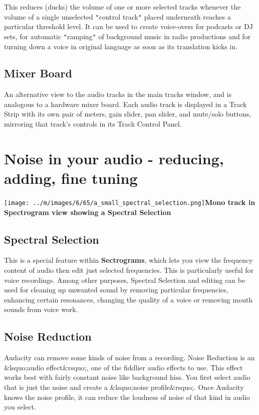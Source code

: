 \documentclass[twocolumn]{book}
\begin{document}
This reduces (ducks) the volume of one or more selected tracks whenever the volume of a single unselected \texttt{{}"{}}control track\texttt{{}"{}} placed underneath reaches a particular threshold level. It can be used to create voice-overs for podcasts or DJ sets, for automatic \texttt{{}"{}}ramping\texttt{{}"{}} of background music in radio productions and for turning down a voice in original language as soon as its translation kicks in.

\subsection{Mixer Board}


An alternative view to the audio tracks in the main tracks window, and is analogous to a hardware mixer board. Each audio track is displayed in a Track Strip with its own pair of meters, gain slider, pan slider, and mute/solo buttons, mirroring that track's controls in its Track Control Panel. 



\section{Noise in your audio - reducing, adding, fine tuning}

\par\texttt{[image: ../m/images/6/65/a\_small\_spectral\_selection.png]}\textbf{Mono track in Spectrogram view showing a Spectral Selection}

\subsection{Spectral Selection}


This is a special feature within \textbf{Sectrograms}, which lets you view the frequency content of audio then edit just selected frequencies.  This is particularly useful for voice recordings.  Among other purposes, Spectral Selection and editing can be used for cleaning up unwanted sound by removing particular frequencies, enhancing certain resonances, changing the quality of a voice or removing mouth sounds from voice work.

\subsection{Noise Reduction}


Audacity can remove some kinds of noise from a recording.  Noise Reduction is an \&lsquo;audio effect\&rsquo;, one of the fiddlier audio effects to use.  This effect works best with fairly constant noise like background hiss.  You first select audio that is just the noise and create a \&lsquo;noise profile\&rsquo;.  Once Audacity knows the noise profile, it can reduce the loudness of noise of that kind in audio you select. 
\end{document}
